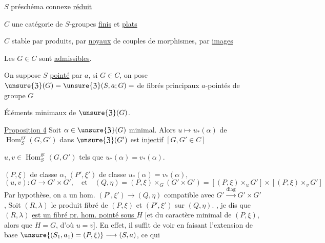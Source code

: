$S$ préschéma connexe \uline{réduit}



$C$ une catégorie de $S$-groupes \uline{finis} et \uline{plats}

$C$ stable par produits,  par \uline{noyaux}
 de couples de morphismes, par \uline{images}

Les $G\in C$ sont \uline{admissibles}.

On  suppose $S$ \uline{pointé} par $a$,
si $G\in C$, on pose
$\unsure{\mathfrak{Z}}(G)=\unsure{\mathfrak{Z}}(S,a;G)=$
 de fibrés  principaux
$a$-pointés de groupe $G$

Éléments minimaux de $\unsure{\mathfrak{Z}}(G)$.

\uline{Proposition 4} Soit $\alpha\in\unsure{\mathfrak{Z}}(G)$ minimal.
Alors $u\mapsto u_*(\alpha)$ de
$\operatorname{Hom}^{\mathrm{gr}}_S(G,G')$ dans
$\unsure{\mathfrak{Z}}(G')$ est \uline{injectif}
$[G,G'\in C]$

$u,v\in\operatorname{Hom}^{\mathrm{gr}}_S(G,G')$ tels que
$u_*(\alpha)=v_*(\alpha)$.

$(P,\xi)$ de classe $\alpha$, $(P',\xi')$ de classe
$u_*(\alpha)=v_*(\alpha)$,
\[
(u,v):G\longrightarrow G'\times G',\quad\text{et}\quad
(Q,\eta)=(P,\xi)\mathbin{\times_G}(G'\times G')
=[(P,\xi)\mathbin{\times_u}G']\times[(P,\xi)\mathbin{\times_v}G']
\]
Par hypothèse, on a un hom. 
$(P',\xi')\longrightarrow(Q,\eta)$ compatible avec
$G'\xrightarrow{\mathrm{diag}}G'\times G'$,
Soit $(R,\lambda)$ le produit fibré de $(P,\xi)$ et $(P',\xi')$ sur $(Q,\eta)$.
,
je dis que $(R,\lambda)$ \uline{est un fibré pr. hom. pointé sous $H$}
[et du caractère minimal de $(P,\xi)$,  alors que
$H=G$, d'où $u=v$]. En effet, il suffit de  voir
 en faisant l'extension de base
$\unsure{(S_1,a_1)=(P,\xi)}\longrightarrow(S,a)$,
ce qui 

